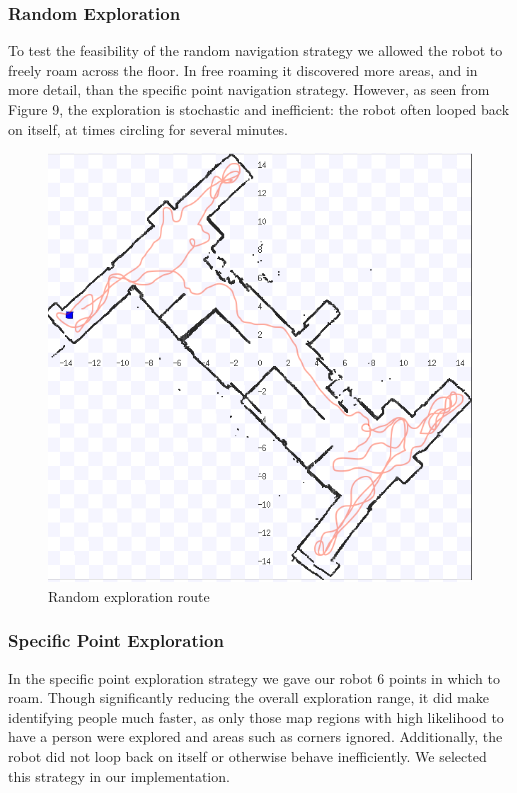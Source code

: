 \documentclass{article}
\begin{document}
\begin{multicols}{2}
      \subsubsection{Random Exploration}
   To test the feasibility of the random navigation strategy we allowed the robot to freely roam across the floor. In free roaming it discovered more areas, and in more detail, than the specific point navigation strategy. However, as seen from Figure 9, the exploration is stochastic and inefficient: the robot often looped back on itself, at times circling for several minutes.
  \begin{figure}[H]
	\begin{center}
              \includegraphics[width=0.8\linewidth]{ExperimentalResults9}
	\end{center}
              \caption{Random exploration route}
          \end{figure}
          
      \subsubsection{Specific Point Exploration}
   In the specific point exploration strategy we gave our robot 6 points in which to roam. Though significantly reducing the overall exploration range, it did make identifying people much faster, as only those map regions with high likelihood to have a person were explored and areas such as corners ignored. Additionally, the robot did not loop back on itself or otherwise behave inefficiently. We selected this strategy in our implementation.


\end{multicols}
\end{document}
